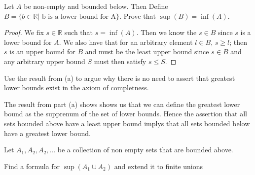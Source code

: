 \documentclass[11pt,largemargins]{homework}
\newcommand{\R}{\mathbb{R}}
\begin{document}
\question 

\begin{alphaparts}
    \questionpart 
    Let $A$ be non-empty and bounded below. Then
    Define $B = \{ b \in \R | \text{ b is a lower bound for A} \}$. Prove that 
    $\sup(B) = \inf(A)$. 

    \begin{proof}
        We fix $s \in \R$ such that $s = \inf(A)$. Then we know the $s \in B$ since $s$ is a lower bound for $A$. We also have that 
        for an arbitrary element $l \in B$, $s \geq l$; then $s$ is an upper bound for $B$ and must be the least upper bound since 
        $s \in B$ and any arbitrary upper bound $S$ must then satisfy $s \leq S$. 
    \end{proof}

    \questionpart 
    Use the result from (a) to argue why there is no need to assert that greatest lower bounds exist in the axiom of completness. 

    The result from part (a) shows shows us that we can define the greatest lower bound as the supprenum of the set of lower bounds. 
    Hence the assertion that all sets bounded above have a least upper bound implys that all sets bounded below have a greatest lower bound. 
\end{alphaparts}

\question 
Let $A_1, A_2, A_2, ... $ be a collection of non empty sets that are bounded above. 

\begin{alphaparts}
    \questionpart
    Find a formula for $\sup(A_1 \cup A_2)$ and extend it to finite unions 
\end{alphaparts}
\end{document}
